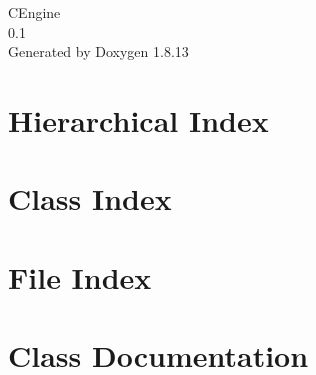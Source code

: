 \documentclass[twoside]{book}
\newcommand{\+}{\discretionary{\mbox{\scriptsize$\hookleftarrow$}}{}{}}
\newcommand{\clearemptydoublepage}{%
  \newpage{\pagestyle{empty}\cleardoublepage}%
}
\begin{document}
\hypersetup{pageanchor=false,
             bookmarksnumbered=true,
             pdfencoding=unicode
            }
\begin{titlepage}
\vspace*{7cm}
\begin{center}%
{\Large C\+Engine \\[1ex]\large 0.\+1 }\\
\vspace*{1cm}
{\large Generated by Doxygen 1.8.13}\\
\end{center}
\end{titlepage}
\clearemptydoublepage
{}
\tableofcontents
\clearemptydoublepage
{}
\hypersetup{pageanchor=true}

\chapter{Hierarchical Index}

\chapter{Class Index}

\chapter{File Index}

\chapter{Class Documentation}




































\end{document}
